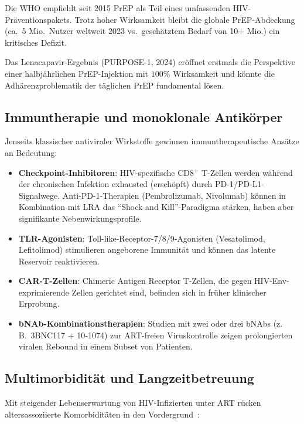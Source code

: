 ﻿\documentclass[a4paper,12pt]{article}
\theoremstyle{definition}
\begin{document}
Die WHO empfiehlt seit 2015 PrEP als Teil eines umfassenden HIV-Pr\"aventionspakets.
Trotz hoher Wirksamkeit bleibt die globale PrEP-Abdeckung (ca.\ 5 Mio.\ Nutzer weltweit
2023 vs.\ gesch\"atztem Bedarf von 10+ Mio.) ein kritisches Defizit.

Das Lenacapavir-Ergebnis (PURPOSE-1, 2024) er\"offnet erstmals die Perspektive
einer halbj\"ahrlichen PrEP-Injektion mit $100\%$ Wirksamkeit und könnte die
Adhärenzproblematik der t\"aglichen PrEP fundamental l\"osen.

\subsection{Immuntherapie und monoklonale Antikörper}

Jenseits klassischer antiviraler Wirkstoffe gewinnen immuntherapeutische Ans\"atze
an Bedeutung:

\begin{itemize}
\item \textbf{Checkpoint-Inhibitoren}: HIV-spezifische CD8$^+$ T-Zellen werden w\"ahrend
      der chronischen Infektion exhausted (erschöpft) durch PD-1/PD-L1-Signalwege.
      Anti-PD-1-Therapien (Pembrolizumab, Nivolumab) k\"onnen in Kombination mit
      LRA das ``Shock and Kill''-Paradigma st\"arken, haben aber signifikante
      Nebenwirkungsprofile.

\item \textbf{TLR-Agonisten}: Toll-like-Receptor-7/8/9-Agonisten (Vesatolimod,
      Lefitolimod) stimulieren angeborene Immunit\"at und k\"onnen das latente
      Reservoir reaktivieren.

\item \textbf{CAR-T-Zellen}: Chimeric Antigen Receptor T-Zellen, die gegen
      HIV-Env-exprimierende Zellen gerichtet sind, befinden sich in fr\"uher
      klinischer Erprobung.

\item \textbf{bNAb-Kombinationstherapien}: Studien mit zwei oder drei bNAbs
      (z.\,B.\ 3BNC117 + 10-1074) zur ART-freien Viruskontrolle zeigen
      prolongierten viralen Rebound in einem Subset von Patienten.
\end{itemize}

\subsection{Multimorbidität und Langzeitbetreuung}

Mit steigender Lebenserwartung von HIV-Infizierten unter ART r\"ucken altersassoziierte
Komorbidit\"aten in den Vordergrund~\cite{bekker2023hiv}:
\end{document}
